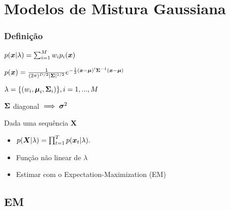 \section{Modelos de Mistura Gaussiana}
\label{sec:gmm}

\contentscurrent

\begin{frame}
\frametitle{Definição}
\begin{description}\itemsep6pt
    \item[GMM] $p(\boldsymbol{x}|\lambda) = \sum_{i=1}^M w_ip_i(\boldsymbol{x})$
    \item[Gaussiana] $p(\boldsymbol{x}) = \frac{1}{(2\pi)^{D/2}|\boldsymbol{\Sigma}|^{1/2}}e^{-\frac{1}{2}(\boldsymbol{x} - \boldsymbol{\mu})'\boldsymbol{\Sigma}^{-1}(\boldsymbol{x} - \boldsymbol{\mu})}$
    \pause
    \item $\lambda = \{(w_i, \boldsymbol{\mu}_i, \boldsymbol{\Sigma}_i)\}, i = 1, ..., M$
    \item $\boldsymbol{\Sigma}$ diagonal $\implies \boldsymbol{\sigma}^2$
    \pause
    \item Dada uma sequência $\boldsymbol{X}$
    \pause
    \begin{itemize}\itemsep4pt
        \item $p(\boldsymbol{X}|\lambda) = \prod_{t=1}^T p(\boldsymbol{x}_t|\lambda).$
        \item Função não linear de $\lambda$
        \item Estimar com o Expectation-Maximization (EM)
    \end{itemize}
\end{description}
\end{frame}

\subsection{EM}

